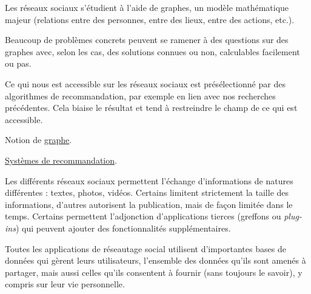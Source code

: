 
\begin{jazzitemize}
\item Les réseaux sociaux s'étudient à l'aide de graphes, un modèle mathématique majeur (relations entre des personnes, entre des lieux, entre des actions, etc.).
\item Beaucoup de problèmes concrets peuvent se ramener à des questions sur des graphes avec, selon les cas, des solutions connues ou non, calculables facilement ou pas.
\item Ce qui nous est accessible sur les réseaux sociaux est présélectionné par des algorithmes de recommandation, par exemple en lien avec nos recherches précédentes. Cela biaise le résultat et tend à restreindre le champ de ce qui est accessible.
\end{jazzitemize}


\begin{jazzitemize}
\item Notion de \href{https://fr.wikipedia.org/wiki/Th\%C3\%A9orie_des_graphes}{graphe}.
\item \href{https://fr.wikipedia.org/wiki/Syst\%C3\%A8me_de_recommandation}{Systèmes de recommandation}.
\end{jazzitemize}


\begin{tcolorbox}[title={Données et information}, toprule=0pt, leftrule=0pt, rightrule=0pt, arc=0pt,
                  fonttitle=\scshape\boxtitlefont,
                  colbacktitle=white, coltitle=firstcolor, colframe=firstcolor, colback=firstcolor!10,
                  breakable, enhanced jigsaw]
Les différents réseaux sociaux permettent l’échange d’informations de natures différentes : textes, photos, vidéos. Certains limitent strictement la taille des informations, d’autres autorisent la publication, mais de façon limitée dans le temps. Certains permettent l’adjonction d’applications tierces (greffons ou \textit{plug-ins}) qui peuvent ajouter des fonctionnalités supplémentaires.

Toutes les applications de réseautage social utilisent d’importantes bases de données qui gèrent leurs utilisateurs, l’ensemble des données qu’ils sont amenés à partager, mais aussi celles qu’ils consentent à fournir (sans toujours le savoir), y compris sur leur vie personnelle.
\end{tcolorbox}

